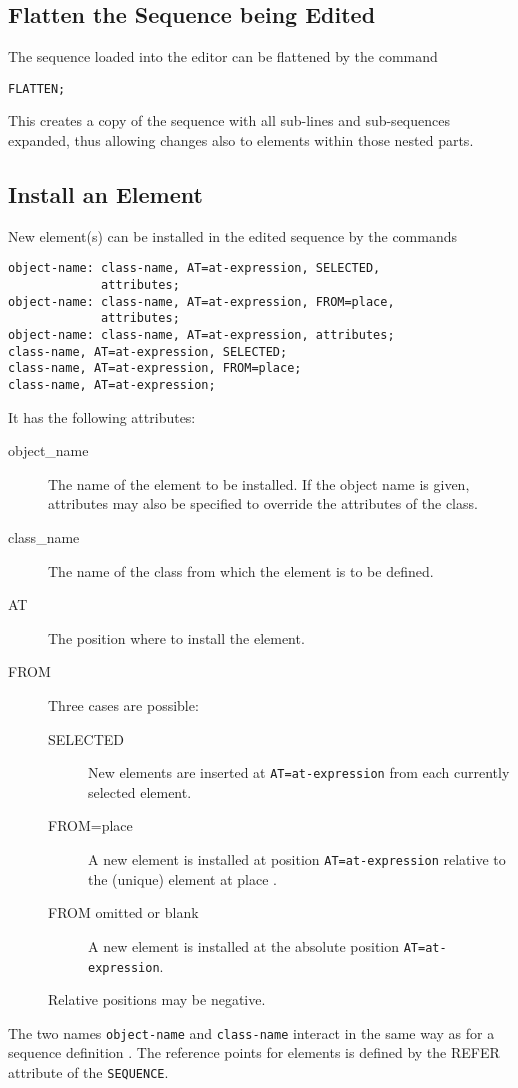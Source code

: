 \subsection{Flatten the Sequence being Edited}
\label{sec:editflat}
The sequence loaded into the editor can be flattened by the command
\begin{verbatim}
FLATTEN;
\end{verbatim}
This creates a copy of the sequence with all sub-lines and
sub-sequences expanded,
thus allowing changes also to elements within those nested parts.

\subsection{Install an Element}
\label{sec:editinstall}
New element(s) can be installed in the edited sequence by the commands
\begin{verbatim}
object-name: class-name, AT=at-expression, SELECTED,
             attributes;
object-name: class-name, AT=at-expression, FROM=place,
             attributes;
object-name: class-name, AT=at-expression, attributes;
class-name, AT=at-expression, SELECTED;
class-name, AT=at-expression, FROM=place;
class-name, AT=at-expression;
\end{verbatim}
It has the following attributes:
\begin{description}
\item[object\_name]
The name of the element to be installed.
If the object name is given, attributes may also be specified to
override the attributes of the class.
\item[class\_name]
The name of the class from which the element is to be defined.
\item[AT]
  The position where to install the element.
\item[FROM]
  Three cases are possible:
  \begin{description}
  \item[SELECTED]
    New elements are inserted at \texttt{AT=at-expression} from each
    currently selected element.
  \item[FROM=place]
    A new element is installed at position \texttt{AT=at-expression}
    relative to the (unique) element at {place} .
  \item[FROM omitted or blank]
    A new element is installed at the absolute position
    \texttt{AT=at-expression}.
  \end{description}
  Relative positions may be negative.
\end{description}
The two names \texttt{object-name} and \texttt{class-name} interact
in the same way as for a sequence definition .
The reference points for elements is defined by the REFER attribute of the
\texttt{SEQUENCE}.

